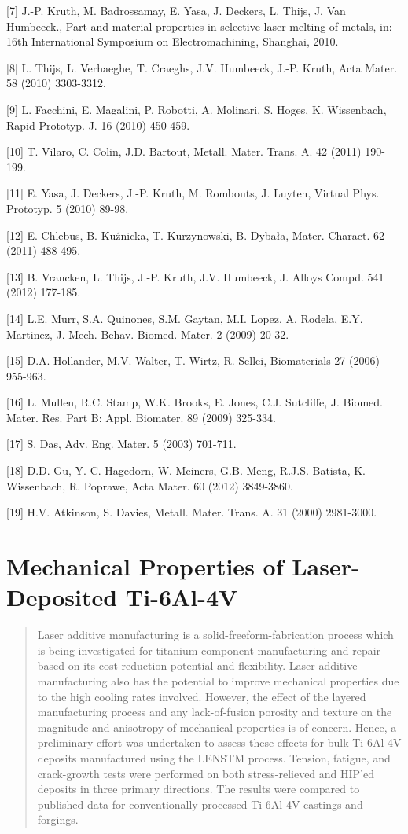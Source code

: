 \documentclass[10pt]{article}
\begin{document}
[7] J.-P. Kruth, M. Badrossamay, E. Yasa, J. Deckers, L. Thijs, J. Van Humbeeck., Part and material properties in selective laser melting of metals, in: 16th International Symposium on Electromachining, Shanghai, 2010.

[8] L. Thijs, L. Verhaeghe, T. Craeghs, J.V. Humbeeck, J.-P. Kruth, Acta Mater. 58 (2010) 3303-3312.

[9] L. Facchini, E. Magalini, P. Robotti, A. Molinari, S. Hoges, K. Wissenbach, Rapid Prototyp. J. 16 (2010) 450-459.

[10] T. Vilaro, C. Colin, J.D. Bartout, Metall. Mater. Trans. A. 42 (2011) 190-199.

[11] E. Yasa, J. Deckers, J.-P. Kruth, M. Rombouts, J. Luyten, Virtual Phys. Prototyp. 5 (2010) 89-98.

[12] E. Chlebus, B. Kuźnicka, T. Kurzynowski, B. Dybała, Mater. Charact. 62 (2011) 488-495.

[13] B. Vrancken, L. Thijs, J.-P. Kruth, J.V. Humbeeck, J. Alloys Compd. 541 (2012) 177-185.

[14] L.E. Murr, S.A. Quinones, S.M. Gaytan, M.I. Lopez, A. Rodela, E.Y. Martinez, J. Mech. Behav. Biomed. Mater. 2 (2009) 20-32.

[15] D.A. Hollander, M.V. Walter, T. Wirtz, R. Sellei, Biomaterials 27 (2006) 955-963.

[16] L. Mullen, R.C. Stamp, W.K. Brooks, E. Jones, C.J. Sutcliffe, J. Biomed. Mater. Res. Part B: Appl. Biomater. 89 (2009) 325-334.

[17] S. Das, Adv. Eng. Mater. 5 (2003) 701-711.

[18] D.D. Gu, Y.-C. Hagedorn, W. Meiners, G.B. Meng, R.J.S. Batista, K. Wissenbach, R. Poprawe, Acta Mater. 60 (2012) 3849-3860.

[19] H.V. Atkinson, S. Davies, Metall. Mater. Trans. A. 31 (2000) 2981-3000.

\section*{Mechanical Properties of Laser-Deposited Ti-6Al-4V }


\begin{abstract}
Laser additive manufacturing is a solid-freeform-fabrication process which is being investigated for titanium-component manufacturing and repair based on its cost-reduction potential and flexibility. Laser additive manufacturing also has the potential to improve mechanical properties due to the high cooling rates involved. However, the effect of the layered manufacturing process and any lack-of-fusion porosity and texture on the magnitude and anisotropy of mechanical properties is of concern. Hence, a preliminary effort was undertaken to assess these effects for bulk Ti-6Al-4V deposits manufactured using the LENSTM process. Tension, fatigue, and crack-growth tests were performed on both stress-relieved and HIP'ed deposits in three primary directions. The results were compared to published data for conventionally processed Ti-6Al-4V castings and forgings.
\end{abstract}
\end{document}

